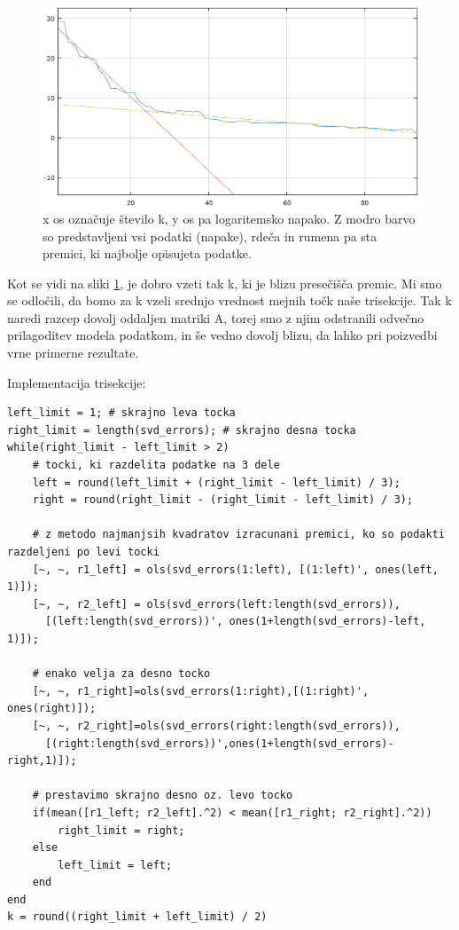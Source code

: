 \documentclass{article}
\begin{document}
\begin{figure}[h]
    \centering
   \includegraphics[width=\textwidth]{graf001}
    \caption{x os označuje število k, y os pa logaritemsko napako. Z modro barvo so predstavljeni vsi podatki (napake), rdeča in rumena pa sta premici, ki najbolje opisujeta podatke. }
    \label{slika:trisekcija1}
\end{figure}

Kot se vidi na sliki \ref{slika:trisekcija1}, je dobro vzeti tak k, ki je blizu presečišča premic. Mi smo se odločili, da bomo za k vzeli srednjo vrednost mejnih točk naše trisekcije. Tak k naredi razcep dovolj oddaljen matriki A, torej smo z njim odstranili odvečno prilagoditev modela podatkom, in še vedno dovolj blizu, da lahko pri poizvedbi vrne primerne rezultate. \\

\pagebreak

Implementacija trisekcije:

\begin{lstlisting}
left_limit = 1; # skrajno leva tocka
right_limit = length(svd_errors); # skrajno desna tocka
while(right_limit - left_limit > 2)
	# tocki, ki razdelita podatke na 3 dele
	left = round(left_limit + (right_limit - left_limit) / 3);
	right = round(right_limit - (right_limit - left_limit) / 3);
  
	# z metodo najmanjsih kvadratov izracunani premici, ko so podakti razdeljeni po levi tocki
	[~, ~, r1_left] = ols(svd_errors(1:left), [(1:left)', ones(left, 1)]);
	[~, ~, r2_left] = ols(svd_errors(left:length(svd_errors)), 
      [(left:length(svd_errors))', ones(1+length(svd_errors)-left, 1)]);
	
  	# enako velja za desno tocko
  	[~, ~, r1_right]=ols(svd_errors(1:right),[(1:right)', ones(right)]);
	[~, ~, r2_right]=ols(svd_errors(right:length(svd_errors)), 
      [(right:length(svd_errors))',ones(1+length(svd_errors)-right,1)]);
  
  	# prestavimo skrajno desno oz. levo tocko
	if(mean([r1_left; r2_left].^2) < mean([r1_right; r2_right].^2))
		right_limit = right;
	else
		left_limit = left;
	end
end
k = round((right_limit + left_limit) / 2)
\end{lstlisting}
\end{document}
